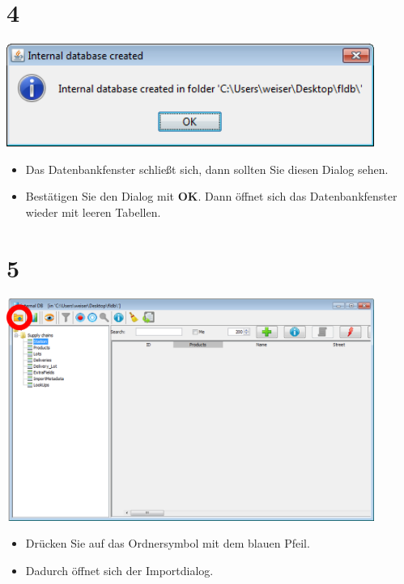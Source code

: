 \documentclass{beamer}
\begin{document}
\section{4}
\begin{frame}
	\begin{center}
  		\includegraphics[width=0.9\textwidth]{4.png}
	\end{center}
	\begin{itemize}
		\item Das Datenbankfenster schließt sich, dann sollten Sie diesen Dialog sehen.
		\item Bestätigen Sie den Dialog mit \textbf{OK}. Dann öffnet sich das Datenbankfenster wieder mit leeren Tabellen.
	\end{itemize}
\end{frame}

\section{5}
\begin{frame}
	\begin{center}
  		\includegraphics[width=0.9\textwidth]{5.png}
	\end{center}
	\begin{itemize}
		\item Drücken Sie auf das Ordnersymbol mit dem blauen Pfeil.
		\item Dadurch öffnet sich der Importdialog.
	\end{itemize}
\end{frame}
\end{document}
